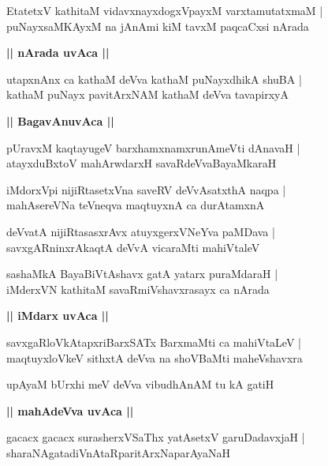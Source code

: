 \documentclass[twoside,12pt,openright]{book}
\newcounter{shloka}[chapter]
\def\uvaca#1{\centerline{{\large\textbf{#1}}}}
\begin{document}
\begin{shloka}%
EtatetxV kathitaM vidavxnayxdogxVpayxM varxtamutatxmaM |\\
puNayxsaMKAyxM na jAnAmi kiM tavxM paqcaCxsi nArada 
\end{shloka}

\uvaca{|| nArada uvAca ||}

\begin{shloka}%
utapxnAnx ca kathaM deVva kathaM puNayxdhikA shuBA |\\
kathaM puNayx pavitArxNAM kathaM deVva tavapirxyA 
\end{shloka}

\uvaca{|| BagavAnuvAca ||}

\begin{shloka}%
pUravxM kaqtayugeV barxhamxnamxrunAmeVti dAnavaH |\\
atayxduBxtoV mahArwdarxH savaRdeVvaBayaMkaraH 
\end{shloka}

\begin{shloka}%
iMdorxVpi nijiRtasetxVna saveRV deVvAsatxthA naqpa |\\
mahAsereVNa teVneqva maqtuyxnA ca durAtamxnA 
\end{shloka}

\begin{shloka}%
deVvatA nijiRtasasxrAvx atuyxgerxVNeYva paMDava |\\
savxgARninxrAkaqtA deVvA vicaraMti mahiVtaleV 
\end{shloka}

\begin{shloka}%
sashaMkA BayaBiVtAshavx gatA yatarx puraMdaraH |\\
iMderxVN kathitaM savaRmiVshavxrasayx ca nArada 
\end{shloka}

\uvaca{|| iMdarx uvAca ||}

\begin{shloka}%
savxgaRloVkAtapxriBarxSATx BarxmaMti ca mahiVtaLeV |\\
maqtuyxloVkeV sithxtA deVva na shoVBaMti maheVshavxra
\end{shloka}

\begin{shloka}%
upAyaM bUrxhi meV deVva vibudhAnAM tu kA gatiH 
\end{shloka}

\uvaca{|| mahAdeVva uvAca ||}

\begin{shloka}%
gacacx gacacx surasherxVSaThx yatAsetxV garuDadavxjaH |\\
sharaNAgatadiVnAtaRparitArxNaparAyaNaH 
\end{shloka}
\end{document}
